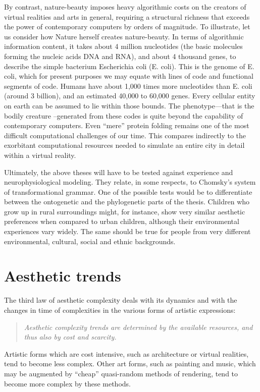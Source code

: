 \documentclass[rmp,amssymb,showpacs,showkeys,12pt,preprint]{revtex4}
\begin{document}
By contrast, nature-beauty imposes heavy algorithmic costs on the creators of
virtual realities and arts in general, requiring a structural richness that
exceeds the power of contemporary computers by orders of magnitude.
To illustrate, let us consider how Nature herself creates nature-beauty. In
terms of algorithmic information content, it takes about 4 million
nucleotides (the basic molecules forming the nucleic acids DNA and RNA), and
about 4 thousand genes, to describe the simple bacterium Escherichia coli
(E. coli). This is the genome of E. coli, which for present purposes we may
equate with lines of code and functional segments of code.
Humans have about 1,000 times more nucleotides
than E. coli (around 3 billion), and an estimated 40,000 to 60,000 genes.
Every cellular entity on earth can be assumed to lie within those bounds.
The phenotype---that is the bodily creature --generated from these codes is
quite beyond the capability of contemporary computers. Even ``mere'' protein
folding remains one of the most difficult computational challenges of our
time. This compares indirectly to the exorbitant computational resources
needed to simulate an entire city in detail within a virtual reality.


Ultimately, the above theses will have to be tested against
experience and neurophysiological modeling. They relate, in some respects,
to Chomsky's system of transformational grammar. One of the possible tests
would be to differentiate between the ontogenetic and the phylogenetic parts
of the thesis. Children who grow up in rural surroundings might, for
instance, show very similar aesthetic preferences when compared to urban
children, although their environmental experiences vary widely. The same
should be true for people from very different environmental, cultural,
social and ethnic backgrounds.



\section{Aesthetic trends}

The third law of aesthetic complexity deals with its dynamics and with the changes in time of complexities in the various forms of artistic expressions:
\begin{quote}
{\em
Aesthetic complexity trends are determined by the available resources, and thus also by cost and scarcity.
}
\end{quote}

Artistic forms which are cost intensive, such as architecture or virtual realities, tend to become less complex.
Other art forms, such as painting and music, which may be augmented by ``cheap'' quasi-random methods of rendering, tend to become more complex by these methods.
\end{document}
